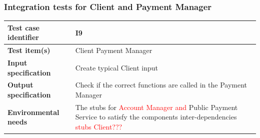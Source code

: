 \documentclass[a4paper,11pt]{report} %
\begin{document}
		\subsubsection{Integration tests for Client and Payment Manager} \label{sec:3.1.6}
			\begin{minipage}{\linewidth}
			\end{minipage}
		\begin{center}
			\renewcommand{\arraystretch}{1.2}
			\setlength{\tabcolsep}{24pt}
			\begin{tabular}{ l  p{9cm}}\hline
				\textbf{Test case identifier} & I9\\\hline
				\textbf{Test item(s)} & Client \textrightarrow Payment Manager\\\hline
				\textbf{Input specification} & Create typical Client input \\\hline
				\textbf{Output specification} & Check if the correct functions are called in the Payment Manager\\\hline
				\textbf{Environmental needs} &  The stubs for \textcolor{red}{Account Manager and }Public Payment Service to satisfy the components inter-dependencies \textcolor{red}{stubs Client???}\\\hline
			\end{tabular}
		\end{center}
		
		\pagebreak		
\end{document}

